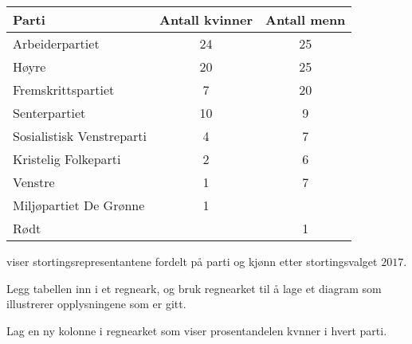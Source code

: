 


\Oppgave[4] %

\begin{table}[H]
    \centering
    \caption{}
    \begin{tabularx}{\textwidth}{| X | *{2}{S[table-format=2.0]|}}
    \Rowcolor
        Parti  \headerstrut & {Antall kvinner} & {Antall menn} \\
    \hline
        Arbeiderpartiet           &        24        &      25 \\
    \hline
        Høyre                     &        20        &      25 \\
    \hline
        Fremskrittspartiet        &         7        &      20 \\
    \hline
        Senterpartiet             &        10        &       9 \\
    \hline
        Sosialistisk Venstreparti &         4        &       7 \\
    \hline
        Kristelig Folkeparti      &         2        &       6 \\
    \hline
        Venstre                   &         1        &       7 \\
    \hline
        Miljøpartiet De Grønne    &         1        &         \\
    \hline
        Rødt                      &                  &       1 \\
    \hline
    \end{tabularx}
    \label{tab:del-1-oppgave-2.1}
\end{table}

 viser stortingsrepresentantene fordelt på parti og
kjønn etter stortingsvalget $2017$.

\begin{oppgaver}
     Legg tabellen inn i et regneark, og bruk regnearket til å lage et
    diagram som illustrerer opplysningene som er gitt.
\end{oppgaver}

\begin{oppgaver}
     Lag en ny kolonne i regnearket som viser prosentandelen kvnner i
    hvert parti.
\end{oppgaver}


